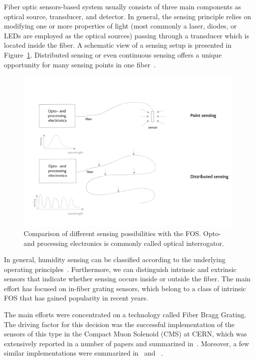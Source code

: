 Fiber optic sensors-based system usually consists of three main components as optical source, transducer, and detector. In general, the sensing principle relies on modifying one or more properties of light (most commonly a laser, diodes, or LEDs are employed as the optical sources) passing through a transducer which is located inside the fiber. A schematic view of a sensing setup is presented in Figure~\ref{fig:sensing}. Distributed sensing or even continuous sensing offers a unique opportunity for many sensing points in one fiber~\cite{GRATTAN200040}. 
\newpage
\begin{figure}[!h]
\centering
\includegraphics[width=0.95\columnwidth]{Chapter5/images/sensing.png}
\caption{Comparison of different sensing possibilities with the \gls{FOS}. Opto- and processing electronics is commonly called optical interrogator.}
\label{fig:sensing}
\end{figure}

In general, humidity sensing can be classified according to the underlying operating principles~\cite{fos_overview}. Furthermore, we can distinguish intrinsic and extrinsic sensors that indicate whether sensing occurs inside or outside the fiber. The main effort has focused on in-fiber grating sensors, which belong to a class of intrinsic \gls{FOS} that has gained popularity in recent years. 

The main efforts were concentrated on a technology called Fiber Bragg Grating. The driving factor for this decision was the successful implementation of the sensors of this type in the Compact Muon Solenoid (\gls{CMS}) at \gls{CERN}, which was extensively reported in a number of papers and summarized in~\cite{Berruti}. Moreover, a few similar implementations were summarized in~\cite{YEO_PI} and ~\cite{Kronenberg:02}. 

